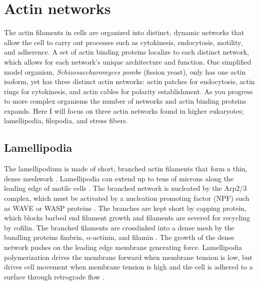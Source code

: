 \section{Actin networks}\label{network-intro}
The actin filaments in cells are organized into distinct, dynamic networks that allow the cell to carry out processes such as cytokinesis, endocytosis, motility, and adherence. A set of actin binding proteins localize to each distinct network, which allows for each network's unique architecture and function. One simplified model organism, \textit{Schizosaccharomyces pombe} (fission yeast), only has one actin isoform, yet has three distinct actin networks: actin patches for endocytosis, actin rings for cytokinesis, and actin cables for polarity establishment. As you progress to more complex organisms the number of networks and actin binding proteins expands. Here I will focus on three actin networks found in higher eukaryotes; lamellipodia, filopodia, and stress fibers. 

\subsection{Lamellipodia}\label{lamellipodia-intro}
The lamellipodium is made of short, branched actin filaments that form a thin, dense meshwork \citep{small_lamellipodium:_2002}. Lamellipodia can extend up to tens of microns along the leading edge of motile cells \citep{skau_specification_2015}. The branched network is nucleated by the Arp2/3 complex, which must be activated by a nucleation promoting factor (NPF) such as WAVE or WASP proteins \citep{blanchoin_actin_2014}. The branches are kept short by capping protein, which blocks barbed end filament growth and filaments are severed for recycling by cofilin. The branched filaments are crosslinked into a dense mesh by the bundling proteins fimbrin, $\alpha$-actinin, and filamin \citep{small_lamellipodium:_2002}. The growth of the dense network pushes on the leading edge membrane generating force. Lamellipodia polymerization drives the membrane forward when membrane tension is low, but drives cell movement when membrane tension is high and the cell is adhered to a surface through retrograde flow \citep{skau_specification_2015}.  

